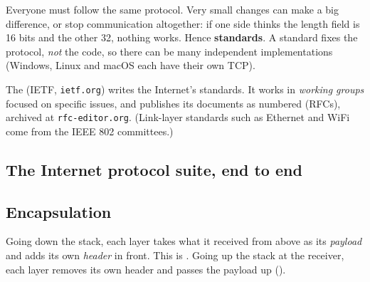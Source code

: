 \begin{intuition}
Everyone must follow the same protocol. Very small changes can make a big difference, or stop communication altogether: if one side thinks the
length field is 16 bits and the other 32, nothing works. Hence \textbf{standards}. A standard fixes the protocol, \emph{not} the code, so there can be many
independent implementations (Windows, Linux and macOS each have their own TCP).
\end{intuition}

\begin{defn}
The  (IETF, \texttt{ietf.org}) writes the Internet's standards. It works in \emph{working groups} focused on specific
issues, and publishes its documents as numbered  (RFCs), archived at \texttt{rfc-editor.org}. (Link-layer standards such as Ethernet and WiFi come from the IEEE 802 committees.)
\end{defn}

\subsection{The Internet protocol suite, end to end}


\subsection{Encapsulation}

\begin{defn}[Encapsulation]
Going down the stack, each layer takes what it received from above as its \emph{payload} and adds its own \emph{header} in front.
This is . Going up the stack at the receiver, each layer removes its own header and passes the payload up ().
\end{defn}


